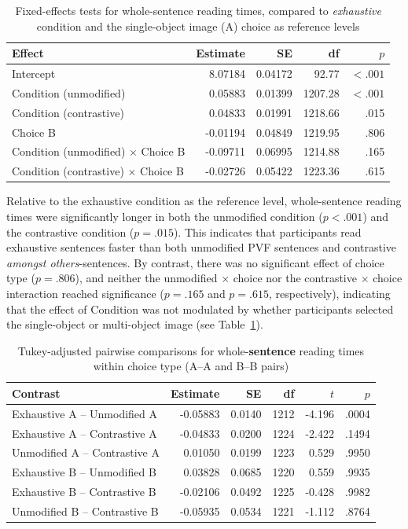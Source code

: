 \documentclass[ruler]{CUP-JNL-LIN}%
\begin{document}
\begin{table}[htbp]
\centering
\caption{Fixed-effects tests for whole-sentence reading times, compared to \textit{exhaustive} condition and the single-object image (A) choice as reference levels}
\label{tab:sentence-rt-fixed}
\begin{tabularx}{\textwidth}{@{}Xrrrr@{}}
\toprule
Effect & Estimate & SE & df & $p$ \\
\midrule
Intercept & 8.07184 & 0.04172 & 92.77 & $< .001$ \\
Condition (unmodified) & 0.05883 & 0.01399 & 1207.28 & $< .001$ \\
Condition (contrastive) & 0.04833 & 0.01991 & 1218.66 & .015 \\
Choice B & -0.01194 & 0.04849 & 1219.95 & .806 \\
Condition (unmodified) $\times$ Choice B & -0.09711 & 0.06995 & 1214.88 & .165 \\
Condition (contrastive) $\times$ Choice B & -0.02726 & 0.05422 & 1223.36 & .615 \\
\bottomrule
\end{tabularx}
\end{table}

Relative to the exhaustive condition as the reference level, whole-sentence reading times were significantly longer in both the unmodified condition ($p<.001$) and the contrastive condition ($p=.015$). This indicates that participants read exhaustive sentences faster than both unmodified PVF sentences and contrastive \textit{amongst others}-sentences. By contrast, there was no significant effect of choice type ($p=.806$), and neither the unmodified $\times$ choice nor the contrastive $\times$ choice interaction reached significance ($p=.165$ and $p=.615$, respectively), indicating that the effect of Condition was not modulated by whether participants selected the single-object or multi-object image (see Table~\ref{tab:sentence-rt-fixed}).

\begin{table}[htbp]
\centering
\caption{Tukey-adjusted pairwise comparisons for whole-\textbf{sentence} reading times within choice type (A--A and B--B pairs)}
\label{tab:sentence-rt-pairwise-within-choice}
\begin{tabularx}{\textwidth}{@{}Xrrrrr@{}}
\toprule
Contrast & Estimate & SE & df & $t$ & $p$ \\
\midrule
Exhaustive A -- Unmodified A   & -0.05883 & 0.0140 & 1212 & -4.196 & .0004 \\
Exhaustive A -- Contrastive A  & -0.04833 & 0.0200 & 1224 & -2.422 & .1494 \\
Unmodified A -- Contrastive A  &  0.01050 & 0.0199 & 1223 &  0.529 & .9950 \\
Exhaustive B -- Unmodified B   &  0.03828 & 0.0685 & 1220 &  0.559 & .9935 \\
Exhaustive B -- Contrastive B  & -0.02106 & 0.0492 & 1225 & -0.428 & .9982 \\
Unmodified B -- Contrastive B  & -0.05935 & 0.0534 & 1221 & -1.112 & .8764 \\
\bottomrule
\end{tabularx}
\end{table}
\end{document}
